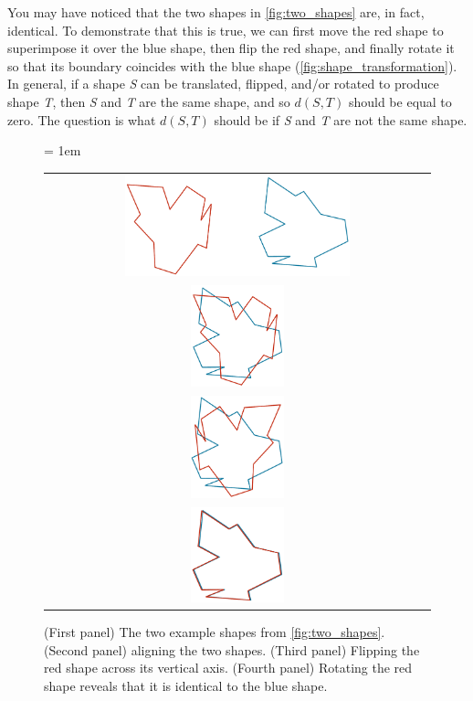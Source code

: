 You may have noticed that the two shapes in \autoref{fig:two_shapes} are, in fact, identical. To demonstrate that this is true, we can first move the red shape to superimpose it over the blue shape, then flip the red shape, and finally rotate it so that its boundary coincides with the blue shape (\autoref{fig:shape_transformation}). In general, if a shape \textit{S} can be translated, flipped, and/or rotated to produce shape \textit{T}, then \textit{S} and \textit{T} are the same shape, and so $d(S, T)$ should be equal to zero. The question is what $d(S, T)$ should be if \textit{S} and \textit{T} are not the same shape.

\begin{figure}[p]
	\centering
	\tabcolsep = 1em
	\mySfFamily
	\begin{tabular}{c}
		\includegraphics[width = 0.6\textwidth]{../images/shape_transformation1.png}\\[2ex]
		\includegraphics[width = 0.25\textwidth]{../images/shape_transformation2.png} \\[2ex]
		\includegraphics[width = 0.25\textwidth]{../images/shape_transformation3.png}\\[2ex]
		\includegraphics[width = 0.25\textwidth]{../images/shape_transformation4.png} \\
	\end{tabular}
	\caption{(First panel) The two example shapes from \autoref{fig:two_shapes}. (Second panel) aligning the two shapes. (Third panel) Flipping the red shape across its vertical axis. (Fourth panel) Rotating the red shape reveals that it is identical to the blue shape.}
	\label{fig:shape_transformation}
\end{figure}

